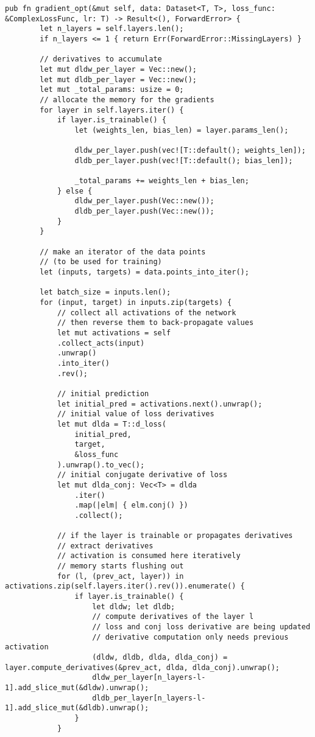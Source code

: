 \begin{lstlisting}[caption=Implementation in Rust of the complex gradient optimization.]
	pub fn gradient_opt(&mut self, data: Dataset<T, T>, loss_func: &ComplexLossFunc, lr: T) -> Result<(), ForwardError> {
		let n_layers = self.layers.len();
		if n_layers <= 1 { return Err(ForwardError::MissingLayers) }
		
		// derivatives to accumulate
		let mut dldw_per_layer = Vec::new();
		let mut dldb_per_layer = Vec::new();
		let mut _total_params: usize = 0;
		// allocate the memory for the gradients
		for layer in self.layers.iter() {
			if layer.is_trainable() {
				let (weights_len, bias_len) = layer.params_len();
				
				dldw_per_layer.push(vec![T::default(); weights_len]);
				dldb_per_layer.push(vec![T::default(); bias_len]);
				
				_total_params += weights_len + bias_len;
			} else {
				dldw_per_layer.push(Vec::new());
				dldb_per_layer.push(Vec::new());
			}
		}
		
		// make an iterator of the data points 
		// (to be used for training)
		let (inputs, targets) = data.points_into_iter();
		
		let batch_size = inputs.len();
		for (input, target) in inputs.zip(targets) {
			// collect all activations of the network
			// then reverse them to back-propagate values
			let mut activations = self
			.collect_acts(input)
			.unwrap()
			.into_iter()
			.rev();
			
			// initial prediction
			let initial_pred = activations.next().unwrap();
			// initial value of loss derivatives
			let mut dlda = T::d_loss(
				initial_pred,
				target,
				&loss_func
			).unwrap().to_vec();
			// initial conjugate derivative of loss
			let mut dlda_conj: Vec<T> = dlda
				.iter()
				.map(|elm| { elm.conj() })
				.collect();
			
			// if the layer is trainable or propagates derivatives
			// extract derivatives
			// activation is consumed here iteratively
			// memory starts flushing out
			for (l, (prev_act, layer)) in activations.zip(self.layers.iter().rev()).enumerate() {
				if layer.is_trainable() {
					let dldw; let dldb;
					// compute derivatives of the layer l
					// loss and conj loss derivative are being updated
					// derivative computation only needs previous activation
					(dldw, dldb, dlda, dlda_conj) = layer.compute_derivatives(&prev_act, dlda, dlda_conj).unwrap();
					dldw_per_layer[n_layers-l-1].add_slice_mut(&dldw).unwrap();
					dldb_per_layer[n_layers-l-1].add_slice_mut(&dldb).unwrap(); 
				}
			}
			

\end{lstlisting}

